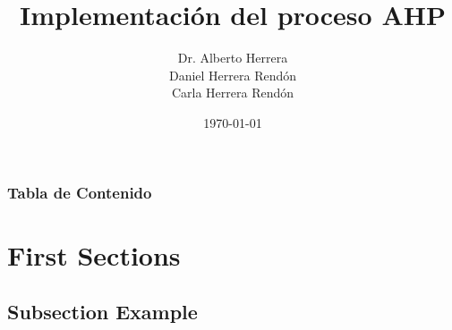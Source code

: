 \documentclass{beamer}
\title[Short title]{Implementación del proceso AHP} %
\author{Dr. Alberto Herrera \\ Daniel Herrera Rendón \\ Carla Herrera Rendón} %
\institute[Rdataa] %
{
Rdataa \\ %
\medskip
}
\date{\today} %
\begin{document}
\begin{frame}
\titlepage %
\end{frame}

\begin{frame}
\frametitle{Tabla de Contenido} %
\tableofcontents %
\end{frame}


\section{First Sections} %

\subsection{Subsection Example} %
\end{document}
